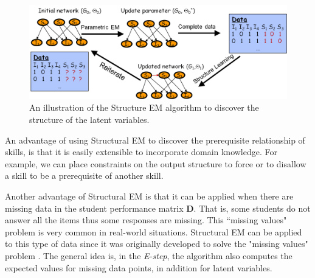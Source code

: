 \documentclass{edm_template}
\begin{document}
\begin{figure}%
	\begin{center}
		\includegraphics[width=1.0\linewidth]{figures/sem.png}
	\end{center}
	\caption{\small An illustration of the Structure EM algorithm to discover the structure of the latent variables.}
	\label{fig:sem} 
\end{figure} 

An advantage of using Structural EM to discover the prerequisite relationship of skills, is that it is easily extensible to incorporate domain knowledge.
For example, we can  place constraints on the output structure to force or to disallow a skill to be a prerequisite of another skill.

Another advantage of Structural EM is that it can be applied when there are missing data in the student performance matrix $\mathbf{D}$. 
That is, some students do not answer all the items thus some responses are missing. This ``missing values" problem is very common in real-world situations.
Structural EM can be applied to this type of data since it was originally developed to solve the "missing values" problem \cite{friedman1997learning}.
The general idea is, in the \emph{E-step}, the algorithm also computes the expected values for missing data points, in addition for latent variables. 
\end{document}
